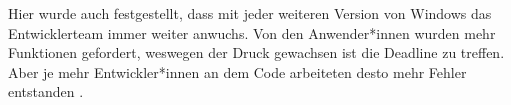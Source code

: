 
Hier wurde auch festgestellt, dass mit jeder weiteren Version von Windows das Entwicklerteam immer weiter anwuchs. Von den Anwender*innen wurden mehr Funktionen gefordert, weswegen der Druck gewachsen ist die Deadline zu treffen. Aber je mehr Entwickler*innen an dem Code arbeiteten desto mehr Fehler entstanden \citep[vgl.][12]{Ogheneovo2014}.

